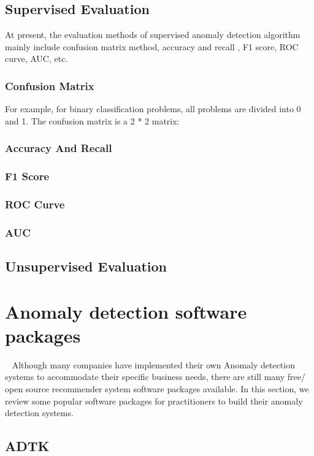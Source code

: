 \subsection{Supervised Evaluation}
At present, the evaluation methods of supervised 
anomaly detection algorithm mainly include 
confusion matrix method,
accuracy  and recall , 
F1 score, 
ROC curve, 
AUC, 
etc.

\subsubsection{Confusion Matrix}
For example, 
for binary classification problems, 
all problems are divided into 0 and 1. 
The confusion matrix is a 2 * 2 matrix:

\subsubsection{Accuracy  And Recall}
\subsubsection{F1 Score}
\subsubsection{ROC Curve}
\subsubsection{AUC}

\subsection{Unsupervised Evaluation}

\section{Anomaly detection software packages}~\label{sec:tools}
Although many companies have implemented their own Anomaly detection systems
to accommodate their specific business needs,
there are still many free/ open source recommender system
software packages available.
In this section,
we review some popular software packages for practitioners
to build their anomaly detection systems.

\subsection{ADTK}

